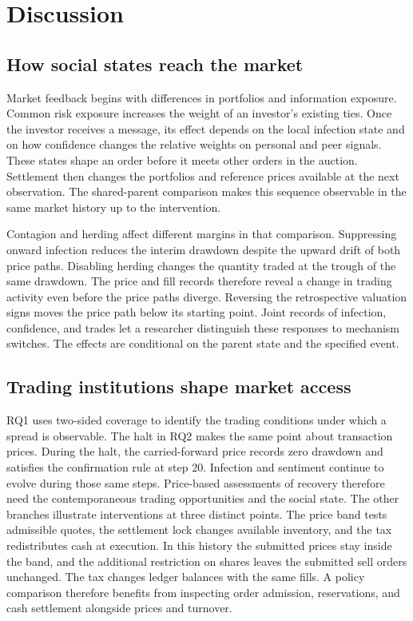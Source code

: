 \section{Discussion}
\label{sec:discussion}

\subsection{How social states reach the market}

Market feedback begins with differences in portfolios and information exposure. Common risk exposure increases the weight of an investor's existing ties. Once the investor receives a message, its effect depends on the local infection state and on how confidence changes the relative weights on personal and peer signals. These states shape an order before it meets other orders in the auction. Settlement then changes the portfolios and reference prices available at the next observation. The shared-parent comparison makes this sequence observable in the same market history up to the intervention.

Contagion and herding affect different margins in that comparison. Suppressing onward infection reduces the interim drawdown despite the upward drift of both price paths. Disabling herding changes the quantity traded at the trough of the same drawdown. The price and fill records therefore reveal a change in trading activity even before the price paths diverge. Reversing the retrospective valuation signs moves the price path below its starting point. Joint records of infection, confidence, and trades let a researcher distinguish these responses to mechanism switches. The effects are conditional on the parent state and the specified event.

\subsection{Trading institutions shape market access}

RQ1 uses two-sided coverage to identify the trading conditions under which a spread is observable. The halt in RQ2 makes the same point about transaction prices. During the halt, the carried-forward price records zero drawdown and satisfies the confirmation rule at step 20. Infection and sentiment continue to evolve during those same steps. Price-based assessments of recovery therefore need the contemporaneous trading opportunities and the social state. The other branches illustrate interventions at three distinct points. The price band tests admissible quotes, the settlement lock changes available inventory, and the tax redistributes cash at execution. In this history the submitted prices stay inside the band, and the additional restriction on shares leaves the submitted sell orders unchanged. The tax changes ledger balances with the same fills. A policy comparison therefore benefits from inspecting order admission, reservations, and cash settlement alongside prices and turnover.

